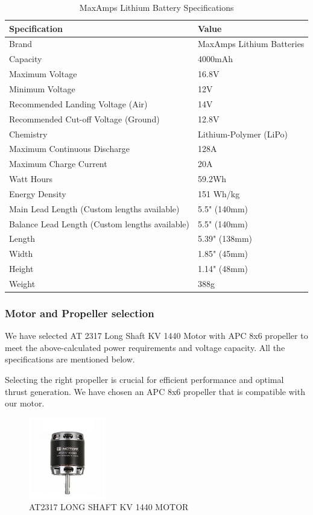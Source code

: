 \documentclass[12 pt]{article}
\begin{document}
\begin{table}[h]
    \centering
    \caption{MaxAmps Lithium Battery Specifications}
    \begin{tabular}{|l|l|}
    \hline
    \textbf{Specification} & \textbf{Value} \\ \hline
    Brand & MaxAmps Lithium Batteries \\
    Capacity & 4000mAh \\
    Maximum Voltage & 16.8V \\
    Minimum Voltage & 12V \\
    Recommended Landing Voltage (Air) & 14V \\
    Recommended Cut-off Voltage (Ground) & 12.8V \\
    Chemistry & Lithium-Polymer (LiPo) \\
    Maximum Continuous Discharge & 128A \\
    Maximum Charge Current & 20A \\
    Watt Hours & 59.2Wh \\
    Energy Density & 151 Wh/kg \\
    Main Lead Length (Custom lengths available) & 5.5" (140mm) \\
    Balance Lead Length (Custom lengths available) & 5.5" (140mm) \\
    Length & 5.39" (138mm) \\
    Width & 1.85" (45mm) \\
    Height & 1.14" (48mm) \\
    Weight & 388g \\ \hline
    \end{tabular}
\end{table}

\subsubsection{Motor and Propeller selection}

We have selected AT 2317 Long Shaft KV 1440 Motor with APC 8x6 propeller to meet the above-calculated power requirements and voltage capacity. All the specifications are mentioned below.

Selecting the right propeller is crucial for efficient performance and optimal thrust generation. We have chosen an APC 8x6 propeller that is compatible with our motor.

\begin{figure}[h]
    \centering
    \includegraphics[width=0.3\textwidth]{motorr.jpg}
    \caption{AT2317 LONG SHAFT KV 1440 MOTOR}
    \label{fig:motor}
\end{figure}
\end{document}
